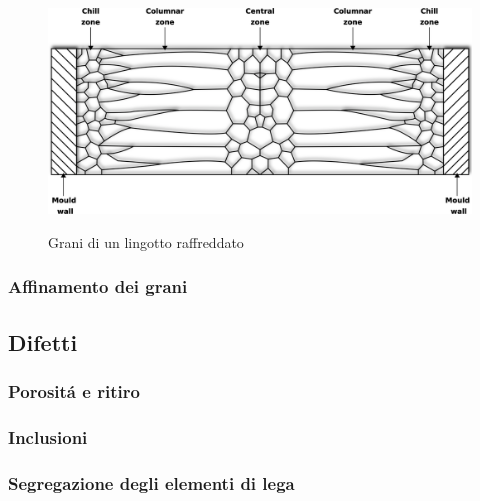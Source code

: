 \documentclass{article}
\begin{document}
            \begin{figure}[h!]
                \centering
                 \label{grain_casting}
                \includegraphics[width=\textwidth]{Sources/grain.eps}
                \caption{Grani di un lingotto raffreddato \autocite{Inkscape}}
            \end{figure}

            \clearpage 

            \subsubsection{Affinamento dei grani\label{Casting_strutt_affinamento}}


            \clearpage


        \subsection{Difetti\label{Casting_difetti}}


        \clearpage 

            \subsubsection{Porositá e ritiro\label{Casting_difetti_porosita}}

            \clearpage 

            \subsubsection{Inclusioni\label{Casting_difetti_inclusioni}}

            \clearpage 

            \subsubsection{Segregazione degli elementi di lega\label{Casting_difetti_segregazione}}
    
\end{document}
